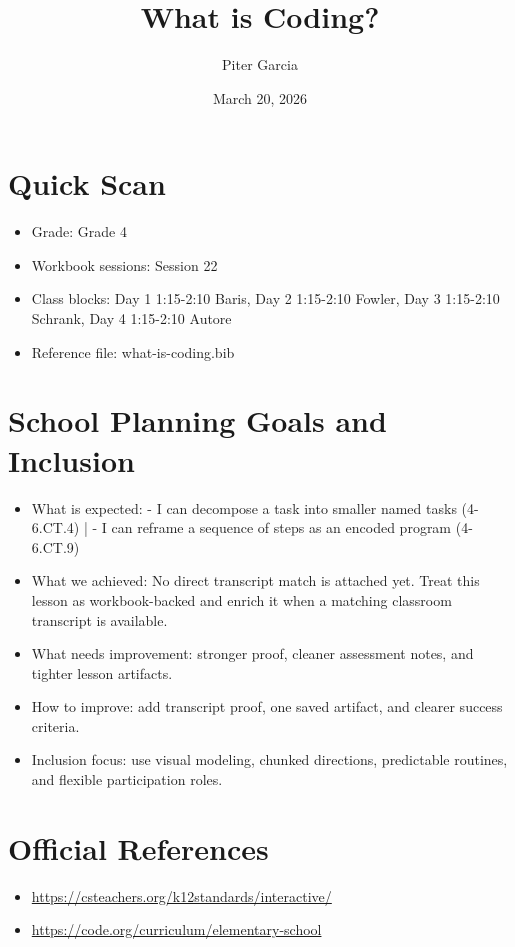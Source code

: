 \documentclass[11pt]{article}
\title{What is Coding?}
\author{Piter Garcia}
\date{March 20, 2026}
\begin{document}
    \maketitle
    \section*{Quick Scan}
    \begin{itemize}[leftmargin=*]
    \item Grade: Grade 4
    \item Workbook sessions: Session 22
    \item Class blocks: Day 1 1:15-2:10 Baris, Day 2 1:15-2:10 Fowler, Day 3 1:15-2:10 Schrank, Day 4 1:15-2:10 Autore
    \item Reference file: what-is-coding.bib
    \end{itemize}
    \section*{School Planning Goals and Inclusion}
    \begin{itemize}[leftmargin=*]
    \item What is expected: - I can decompose a task into smaller named tasks (4-6.CT.4) | - I can reframe a sequence of steps as an encoded program (4-6.CT.9)
    \item What we achieved: No direct transcript match is attached yet. Treat this lesson as workbook-backed and enrich it when a matching classroom transcript is available.
    \item What needs improvement: stronger proof, cleaner assessment notes, and tighter lesson artifacts.
    \item How to improve: add transcript proof, one saved artifact, and clearer success criteria.
    \item Inclusion focus: use visual modeling, chunked directions, predictable routines, and flexible participation roles.
    \end{itemize}
    \section*{Official References}
    \begin{itemize}[leftmargin=*]
    \item \url{https://csteachers.org/k12standards/interactive/}
\item \url{https://code.org/curriculum/elementary-school}

    \end{itemize}
    
\end{document}
